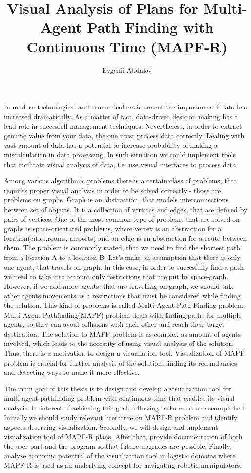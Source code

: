 \documentclass[thesis=B,english]{FITthesis}[2019/12/23]
\title{Visual Analysis of Plans for Multi-Agent Path Finding with Continuous Time (MAPF-R)}
\author{Evgenii Abdalov}
\begin{document}
\begin{introduction}
In modern technological and economical environment the importance of data has increased dramatically. As a matter of fact, data-driven desicion making has a lead role in succesfull management techniques. Nevertheless, in order to extract genuine value from your data, the one must process data correctly. Dealing with vast amount of data has a potential to increase probability of making a miscalculation in data processing. In such situation we could implement tools that facilitate visual analysis of data, i.e. use visual interfaces to process data.

Among various algorithmic problems there is a certain class of problems, that requires proper visual analysis in order to be solved correctly - those are problems on graphs. Graph is an abstraction, that models interconnections between set of objects. It is a collection of vertices and edges, that are defined by pairs of vertices. One of the most common type of problems that are solved on graphs is space-orientated problems, where vertex is an abstraction for a location(cities,rooms, airports) and an edge is an abstraction for a route between them. The problem is commonly stated, that we need to find the shortest path from a location A to a location B. Let's make an assumption that there is only one agent, that travels on graph. In this case, in order to succesfully find a path we need to take into account only restrictions that are put by space-graph. However, if we add more agents, that are travelling on graph, we should take other agents movements as a restrictions that must be considered while finding the solution. This kind of problems is called Multi-Agent Path Finding problem. Multi-Agent Pathfinding(MAPF) problem deals with finding paths for multiple agents, so they can avoid collisions with each other and reach their target destination. The solution to MAPF problem is as complex as amount of agents involved, which leads to the necessity of using visual analysis of the solution. Thus, there is a motivation to design a visualiation tool. Visualization of MAPF problem is crucial for further analysis of the solution, finding its redundancies and detecting ways to make it more effective.
   
The main goal of this thesis is to design and develop a visualization tool for multi-agent pathfinding problem with continuous time that enables its visual analysis. In interest of achieving this goal, following tasks must be accomplished. Initially,we should study relevant literature on MAPF-R problem and identify aspects deserving visualization. Secondly,
we will design and implement visualization tool of MAPF-R plans. After that, provide documentation of both the user part and the program so that future upgrades are possible.
Finally, analyze economic potential of the visualization tool in logistic domains where MAPF-R is used as an underlying concept for navigating robotic manipulators.

\end{introduction}
\end{document}
